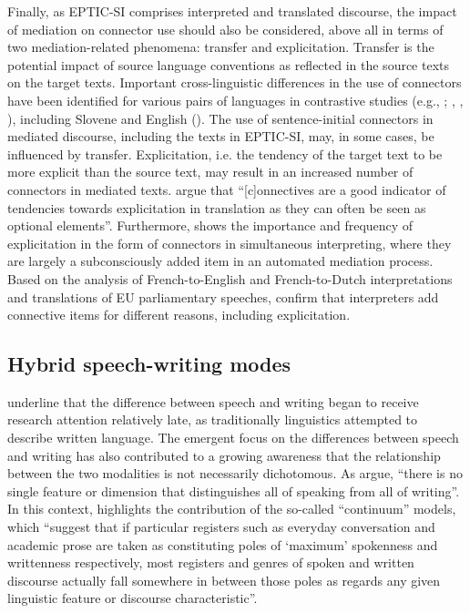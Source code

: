 \documentclass[output=paper]{langscibook}
\begin{document}
Finally, as EPTIC-SI comprises interpreted and translated discourse, the impact of mediation on connector use should also be considered, above all in terms of two mediation-related phenomena: transfer and explicitation. Transfer is the potential impact of source language conventions as reflected in the source texts on the target texts. Important cross-linguistic differences in the use of connectors have been identified for various pairs of languages in contrastive studies (e.g., \citealt{Pit2007}; \citealt{Lapshinova-KoltunskiKunz2014}, \citealt{KunzLapshinova-Koltunski2014}, \citealt{BulcGorjanc2015}), including Slovene and English (\citealt{PisanskiPeterlin2015}). The use of sentence-initial connectors in mediated discourse, including the texts in EPTIC-SI, may, in some cases, be influenced by transfer. Explicitation, i.e. the tendency of the target text to be more explicit than the source text, may result in an increased number of connectors in mediated texts. \citet[2]{MusacchioPalumbo2010} argue that “[c]onnectives are a good indicator of tendencies towards explicitation in translation as they can often be seen as optional elements”. Furthermore, \citet{Gumul2006} shows the importance and frequency of explicitation in the form of connectors in simultaneous interpreting, where they are largely a subconsciously added item in an automated mediation process. Based on the analysis of French-to-English and French-to-Dutch interpretations and translations of EU parliamentary speeches, \citet{DefrancqEtAl2015} confirm that interpreters add connective items for different reasons, including explicitation. 

\subsection{Hybrid speech-writing modes}\label{sec:mikolic:3.2}

\citet[383]{ChafeTannen1987} underline that the difference between speech and writing began to receive research attention relatively late, as traditionally linguistics attempted to describe written language. The emergent focus on the differences between speech and writing has also contributed to a growing awareness that the relationship between the two modalities is not necessarily dichotomous. As \citet[391]{ChafeTannen1987} argue, “there is no single feature or dimension that distinguishes all of speaking from all of writing”. In this context, \citet[30]{Wikstroem2017} highlights the contribution of the so-called “continuum” models, which “suggest that if particular registers such as everyday conversation and academic prose are taken as constituting poles of ‘maximum’ spokenness and writtenness respectively, most registers and genres of spoken and written discourse actually fall somewhere in between those poles as regards any given linguistic feature or discourse characteristic”.
\end{document}
